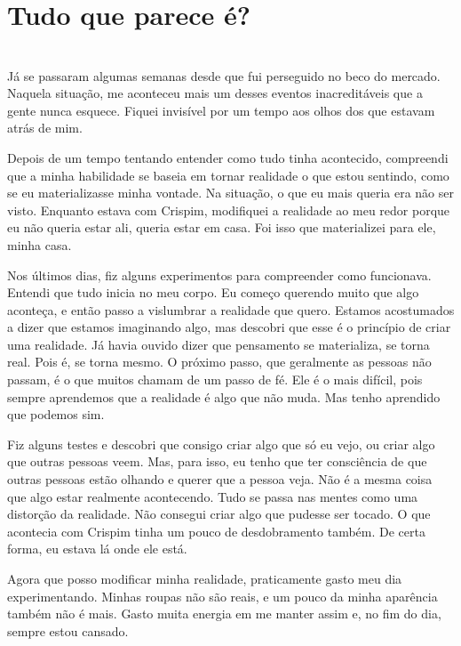 

\newpage


\ifdefined\useChapters
\chapter{Tudo que parece é?}
\else
\chapter{}
\fi

Já se passaram algumas semanas desde que fui perseguido no beco do mercado. Naquela situação, me aconteceu mais um desses eventos inacreditáveis que a gente nunca esquece. Fiquei invisível por um tempo aos olhos dos que estavam atrás de mim.

Depois de um tempo tentando entender como tudo tinha acontecido, compreendi que a minha habilidade se baseia em tornar realidade o que estou sentindo, como se eu materializasse minha vontade. Na situação, o que eu mais queria era não ser visto. Enquanto estava com Crispim, modifiquei a realidade ao meu redor porque eu não queria estar ali, queria estar em casa. Foi isso que materializei para ele, minha casa.

Nos últimos dias, fiz alguns experimentos para compreender como funcionava. Entendi que tudo inicia no meu corpo. Eu começo querendo muito que algo aconteça, e então passo a vislumbrar a realidade que quero. Estamos acostumados a dizer que estamos imaginando algo, mas descobri que esse é o princípio de criar uma realidade. Já havia ouvido dizer que pensamento se materializa, se torna real. Pois é, se torna mesmo. O próximo passo, que geralmente as pessoas não passam, é o que muitos chamam de um passo de fé. Ele é o mais difícil, pois sempre aprendemos que a realidade é algo que não muda. Mas tenho aprendido que podemos sim.

Fiz alguns testes e descobri que consigo criar algo que só eu vejo, ou criar algo que outras pessoas veem. Mas, para isso, eu tenho que ter consciência de que outras pessoas estão olhando e querer que a pessoa veja. Não é a mesma coisa que algo estar realmente acontecendo. Tudo se passa nas mentes como uma distorção da realidade. Não consegui criar algo que pudesse ser tocado. O que acontecia com Crispim tinha um pouco de desdobramento também. De certa forma, eu estava lá onde ele está.

Agora que posso modificar minha realidade, praticamente gasto meu dia experimentando. Minhas roupas não são reais, e um pouco da minha aparência também não é mais. Gasto muita energia em me manter assim e, no fim do dia, sempre estou cansado.


